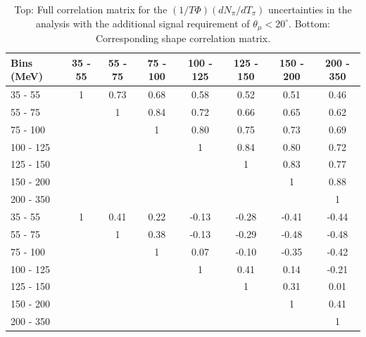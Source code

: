 \begingroup
\squeezetable
\begin{table}[h]
\begin{tabular}{l|ccccccc}
\hline\hline
Bins (MeV) & 35 - 55 & 55 - 75 & 75 - 100 & 100 - 125 & 125 - 150 & 150 - 200 & 200 - 350 \\ 
\hline
35 - 55 & 1 & 0.73 & 0.68 & 0.58 & 0.52 & 0.51 & 0.46 \\ 
55 - 75 &  & 1 & 0.84 & 0.72 & 0.66 & 0.65 & 0.62 \\ 
75 - 100 &  &  & 1 & 0.80 & 0.75 & 0.73 & 0.69 \\ 
100 - 125 &  &  &  & 1 & 0.84 & 0.80 & 0.72 \\ 
125 - 150 &  &  &  &  & 1 & 0.83 & 0.77 \\ 
150 - 200 &  &  &  &  &  & 1 & 0.88 \\ 
200 - 350 &  &  &  &  &  &  & 1 \\ 
\hline
35 - 55 & 1 & 0.41 & 0.22 & -0.13 & -0.28 & -0.41 & -0.44 \\ 
55 - 75 &  & 1 & 0.38 & -0.13 & -0.29 & -0.48 & -0.48 \\ 
75 - 100 &  &  & 1 & 0.07 & -0.10 & -0.35 & -0.42 \\ 
100 - 125 &  &  &  & 1 & 0.41 & 0.14 & -0.21 \\ 
125 - 150 &  &  &  &  & 1 & 0.31 & 0.01 \\ 
150 - 200 &  &  &  &  &  & 1 & 0.41 \\ 
200 - 350 &  &  &  &  &  &  & 1 \\ 
\hline\hline
\end{tabular}
\caption{Top: Full correlation matrix for the $(1/T\Phi)(dN_{\pi} / dT_\pi)$ uncertainties in the \ccpi analysis with the additional signal requirement of $\theta_\mu < 20^\circ$.  Bottom: Corresponding shape correlation matrix.}
\end{table}
\endgroup


